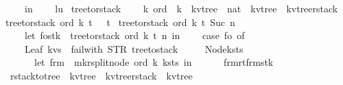 \begin{isabellebody}
\ \ \ \ in\isanewline
\ \ \ \ {\isacharparenleft}l{\isacharcomma}u{\isacharparenright}{\isacharparenright}{\isachardoublequoteclose}\isanewline
\isanewline
\isanewline
\isanewline
\isanewline
\isanewline
\isanewline
{}\isamarkupfalse%
\ tree{\isacharunderscore}to{\isacharunderscore}rstack\ {\isacharcolon}{\isacharcolon}\ \isanewline
\ \ {\isachardoublequoteopen}{\isacharprime}k\ ord\ {\isasymRightarrow}\ {\isacharprime}k\ {\isasymRightarrow}\ {\isacharparenleft}{\isacharprime}k{\isacharcomma}{\isacharprime}v{\isacharparenright}tree\ {\isasymRightarrow}\ nat\ {\isasymRightarrow}\ {\isacharparenleft}{\isacharparenleft}{\isacharprime}k{\isacharcomma}{\isacharprime}v{\isacharparenright}tree\ {\isacharasterisk}\ {\isacharparenleft}{\isacharprime}k{\isacharcomma}{\isacharprime}v{\isacharparenright}tree{\isacharunderscore}rstack{\isacharparenright}{\isachardoublequoteclose}\ \isanewline
{}\isanewline
{\isachardoublequoteopen}tree{\isacharunderscore}to{\isacharunderscore}rstack\ ord\ k\ t\ {}\ {\isacharequal}\ {\isacharparenleft}t{\isacharcomma}{\isacharbrackleft}{\isacharbrackright}{\isacharparenright}{\isachardoublequoteclose}\isanewline
{\isacharbar}\ {\isachardoublequoteopen}tree{\isacharunderscore}to{\isacharunderscore}rstack\ ord\ k\ t\ {\isacharparenleft}Suc\ n{\isacharparenright}\ {\isacharequal}\ {\isacharparenleft}\isanewline
\ \ \ \ let\ {\isacharparenleft}fo{\isacharcomma}stk{\isacharparenright}\ {\isacharequal}\ tree{\isacharunderscore}to{\isacharunderscore}rstack\ ord\ k\ t\ n\ in\isanewline
\ \ \ \ case\ fo\ of\ \isanewline
\ \ \ \ Leaf\ kvs\ {\isasymRightarrow}\ {\isacharparenleft}failwith\ {\isacharparenleft}STR\ {\isacharprime}{\isacharprime}tree{\isacharunderscore}to{\isacharunderscore}stack{\isacharprime}{\isacharprime}{\isacharparenright}{\isacharparenright}\isanewline
\ \ \ \ {\isacharbar}\ Node{\isacharparenleft}ks{\isacharcomma}ts{\isacharparenright}\ {\isasymRightarrow}\ {\isacharparenleft}\isanewline
\ \ \ \ \ \ let\ frm\ {\isacharequal}\ mk{\isacharunderscore}rsplit{\isacharunderscore}node\ ord\ k\ {\isacharparenleft}ks{\isacharcomma}ts{\isacharparenright}\ in\isanewline
\ \ \ \ \ \ {\isacharparenleft}frm{\isacharbar}{\isachargreater}r{\isacharunderscore}t{\isacharcomma}frm{\isacharhash}stk{\isacharparenright}{\isacharparenright}{\isacharparenright}{\isachardoublequoteclose}\isanewline
\isanewline
\isanewline
\isanewline
{}\isamarkupfalse%
\ rstack{\isacharunderscore}to{\isacharunderscore}tree\ {\isacharcolon}{\isacharcolon}\ {\isachardoublequoteopen}{\isacharparenleft}{\isacharprime}k{\isacharcomma}{\isacharprime}v{\isacharparenright}tree\ {\isasymRightarrow}\ {\isacharparenleft}{\isacharprime}k{\isacharcomma}{\isacharprime}v{\isacharparenright}tree{\isacharunderscore}rstack\ {\isasymRightarrow}\ {\isacharparenleft}{\isacharprime}k{\isacharcomma}{\isacharprime}v{\isacharparenright}tree{\isachardoublequoteclose}\ \isanewline

\end{isabellebody}
